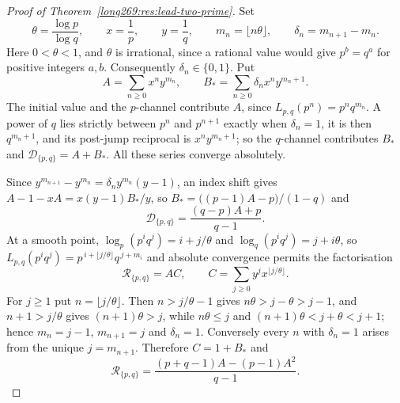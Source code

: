 \documentclass[11pt]{article}
\begin{document}
\begin{proof}[Proof of Theorem~\ref{long269:res:lead-two-prime}]
Set
\[
 \theta=\frac{\log p}{\log q},\qquad x=\frac1p,\qquad y=\frac1q,\qquad
 m_n=\lfloor n\theta\rfloor,\qquad \delta_n=m_{n+1}-m_n .
\]
Here $0<\theta<1$, and $\theta$ is irrational, since a rational value would
give $p^{b}=q^{a}$ for positive integers $a,b$.  Consequently
$\delta_n\in\{0,1\}$.  Put
\[
 A=\sum_{n\ge0}x^ny^{m_n},
 \qquad
 B_\ast=\sum_{n\ge0}\delta_nx^ny^{m_n+1} .
\]
The initial value and the $p$-channel contribute $A$, since
$L_{p,q}(p^n)=p^nq^{m_n}$.  A power of $q$ lies strictly between $p^n$ and
$p^{n+1}$ exactly when $\delta_n=1$, it is then $q^{m_n+1}$, and its post-jump
reciprocal is $x^ny^{m_n+1}$; so the $q$-channel contributes $B_\ast$ and
$\mathcal D_{\{p,q\}}=A+B_\ast$.  All these series converge absolutely.

Since $y^{m_{n+1}}-y^{m_n}=\delta_ny^{m_n}(y-1)$, an index shift gives
$A-1-xA=x(y-1)B_\ast/y$, so $B_\ast=\bigl((p-1)A-p\bigr)/(1-q)$ and
\begin{equation}\label{long269:eq:two-prime-affine}
 \mathcal D_{\{p,q\}}=\frac{(q-p)A+p}{q-1} .
\end{equation}
At a smooth point, $\log_p(p^iq^j)=i+j/\theta$ and
$\log_q(p^iq^j)=j+i\theta$, so
$L_{p,q}(p^iq^j)=p^{\,i+\lfloor j/\theta\rfloor}q^{\,j+m_i}$ and absolute
convergence permits the factorisation
\[
 \mathcal R_{\{p,q\}}=AC,\qquad C=\sum_{j\ge0}y^jx^{\lfloor j/\theta\rfloor}.
\]
For $j\ge1$ put $n=\lfloor j/\theta\rfloor$.  Then $n>j/\theta-1$ gives
$n\theta>j-\theta>j-1$, and $n+1>j/\theta$ gives $(n+1)\theta>j$, while
$n\theta\le j$ and $(n+1)\theta<j+\theta<j+1$; hence $m_n=j-1$, $m_{n+1}=j$ and
$\delta_n=1$.  Conversely every $n$ with $\delta_n=1$ arises from the unique
$j=m_{n+1}$.  Therefore $C=1+B_\ast$ and
\begin{equation}\label{long269:eq:two-prime-quadratic}
 \mathcal R_{\{p,q\}}
 =\frac{(p+q-1)A-(p-1)A^{2}}{q-1} .
\end{equation}


\end{proof}
\end{document}
